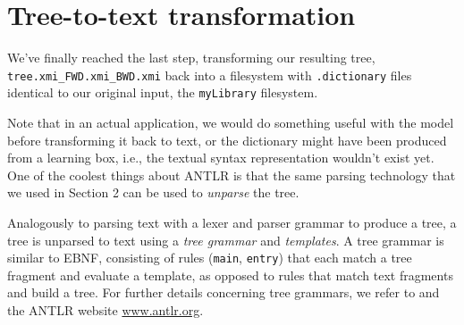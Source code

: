 \newpage
\hypertarget{finalStep}{}
\section{Tree-to-text transformation}
\genHeader

We've finally reached the last step, transforming our resulting tree, \texttt{tree\-.xmi\-\_FWD\-.xmi\-\_BWD\-.xmi} back into a filesystem with
\texttt{.dictionary} files identical to our original input, the \texttt{myLibrary} filesystem. 

Note that in an actual application, we would do something useful with the model before transforming it back to text, or the dictionary might have been produced
from a learning box, i.e., the textual syntax representation wouldn't exist yet. One of the coolest things about ANTLR is that the same parsing technology that
we used in Section 2 can be used to \emph{unparse} the tree.

Analogously to parsing text with a lexer and parser grammar to produce a tree, a tree is unparsed to text using a \emph{tree grammar} and \emph{templates}. A
tree grammar is similar to EBNF, consisting of rules (\texttt{main}, \texttt{entry}) that each match a tree fragment and evaluate a template, as
opposed to rules that match text fragments and build a tree. For further details concerning tree grammars, we refer to \cite{ANTLR} and the ANTLR
website \url{www.antlr.org}.

